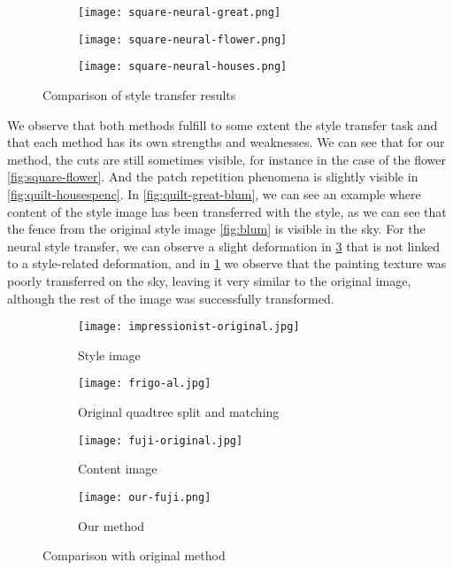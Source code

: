 \documentclass[a4paper]{article}
\begin{document}
\begin{figure}[!h]
\begin{subfigure}{.34\textwidth}
  \texttt{[image: square-neural-great.png]}
  \caption{\label{fig:square-neural-great}}
\end{subfigure}
\begin{subfigure}{.32\textwidth}
  \centering
  \texttt{[image: square-neural-flower.png]}
  \caption{\label{fig:square-neural-flower}}
\end{subfigure}
\begin{subfigure}{.32\textwidth}
  \centering
  \texttt{[image: square-neural-houses.png]}
  \caption{\label{fig:square-neural-houses}}
\end{subfigure}
\caption{Comparison of style transfer results}
\label{fig:result-comparison}
\end{figure}
\newpage

We observe that both methods fulfill to some extent the style transfer task and that each method has its own strengths and weaknesses.
We can see that for our method, the cuts are still sometimes visible, for instance in the case of the flower \ref{fig:square-flower}. And the patch repetition phenomena is slightly visible in \ref{fig:quilt-housespenc}. In \ref{fig:quilt-great-blum}, we can see an example where content of the style image has been transferred with the style, as we can see that the fence from the original style image \ref{fig:blum} is visible in the sky.
For the neural style transfer, we can observe a slight deformation in \ref{fig:square-neural-houses} that is not linked to a style-related deformation, and in \ref{fig:square-neural-great} we observe that the painting texture was poorly transferred on the sky, leaving it very similar to the original image, although the rest of the image was successfully transformed.


\begin{figure}[!h]
\centering
\begin{subfigure}{.32\textwidth}
  \centering
  \texttt{[image: impressionist-original.jpg]}
  \caption{\label{fig:impressionist-original} Style image}
\end{subfigure}
\begin{subfigure}{.32\textwidth}
  \centering
  \texttt{[image: frigo-al.jpg]}
  \caption{\label{fig:frigo-al} Original quadtree split and matching}
\end{subfigure}
\begin{subfigure}{.34\textwidth}
  \centering
  \texttt{[image: fuji-original.jpg]}
  \caption{\label{fig:fuji-original}Content image}
\end{subfigure}
\begin{subfigure}{.32\textwidth}
  \centering
  \texttt{[image: our-fuji.png]}
  \caption{\label{fig:our-fuji}Our method}
\end{subfigure}
\caption{Comparison with original method}
\label{fig:original-comparison}
\end{figure}
\end{document}
